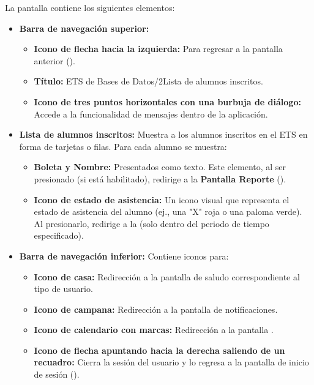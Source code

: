 La pantalla contiene los siguientes elementos:
\begin{itemize}
	\item \textbf{Barra de navegación superior:}
	\begin{itemize}
		\item \textbf{Icono de flecha hacia la izquierda:} Para regresar a la pantalla anterior ().
		\item \textbf{Título:} ETS de Bases de Datos/2\newline Lista de alumnos inscritos.
		\item \textbf{Icono de tres puntos horizontales con una burbuja de diálogo:} Accede a la funcionalidad de mensajes dentro de la aplicación.
	\end{itemize}
	\item \textbf{Lista de alumnos inscritos:} Muestra a los alumnos inscritos en el ETS en forma de tarjetas o filas. Para cada alumno se muestra:
	\begin{itemize}
		\item \textbf{Boleta y Nombre:} Presentados como texto. Este elemento, al ser presionado (si está habilitado), redirige a la \textbf{Pantalla Reporte} ().
		\item \textbf{Icono de estado de asistencia:} Un icono visual que representa el estado de asistencia del alumno (ej., una "X" roja o una paloma verde). Al presionarlo, redirige a la  (solo dentro del periodo de tiempo especificado).
	\end{itemize}
	\item \textbf{Barra de navegación inferior:} Contiene iconos para:
	\begin{itemize}
		\item \textbf{Icono de casa:} Redirección a la pantalla de saludo correspondiente al tipo de usuario.
		\item \textbf{Icono de campana:} Redirección a la pantalla de notificaciones.
		\item \textbf{Icono de calendario con marcas:} Redirección a la pantalla .
		\item \textbf{Icono de flecha apuntando hacia la derecha saliendo de un recuadro:} Cierra la sesión del usuario y lo regresa a la pantalla de inicio de sesión ().
	\end{itemize}
\end{itemize}

